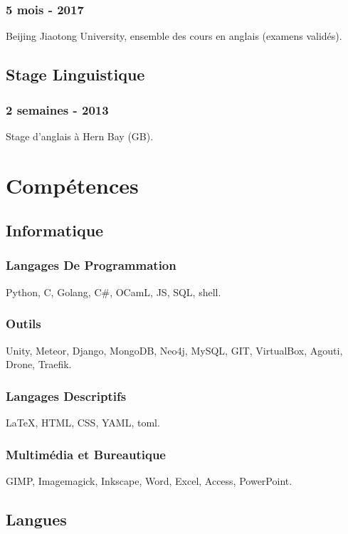 \documentclass{article}
\begin{document}
\begin{multicols}{2}
                \subsubsection{5 mois - 2017}
                    Beijing Jiaotong University, ensemble des cours en anglais (examens valid\'es).
            \subsection{Stage Linguistique}
                \subsubsection{2 semaines - 2013}
                    Stage d'anglais \`a Hern Bay (GB).

        \columnbreak

        \section{Comp\'etences}
            \subsection{Informatique}
                \subsubsection{Langages De Programmation}
                    Python, C, Golang, C\#, OCamL, JS, SQL, shell.
                \subsubsection{Outils}
                    Unity, Meteor, Django,  MongoDB, Neo4j, MySQL, GIT, VirtualBox, Agouti, Drone, Traefik.
                \subsubsection{Langages Descriptifs}
                    {\LaTeX}, HTML, CSS, YAML, toml.
                \subsubsection{Multim\'edia et Bureautique}
                    GIMP, Imagemagick, Inkscape, Word, Excel, Access, PowerPoint.
            \subsection{Langues}

\end{multicols}
\end{document}
